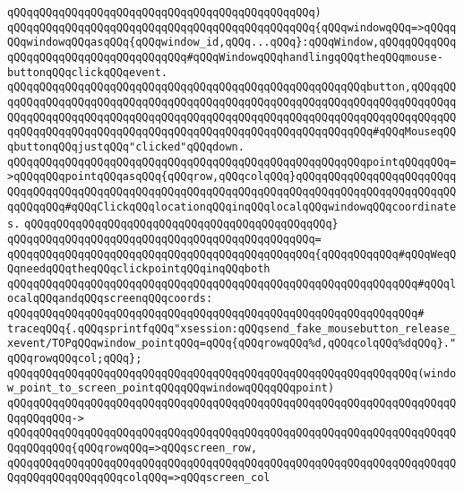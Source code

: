 \verb|qQQqqQQqqQQqqQQqqQQqqQQqqQQqqQQqqQQqqQQqqQQqqQQq)|\newline
\verb|qQQqqQQqqQQqqQQqqQQqqQQqqQQqqQQqqQQqqQQqqQQqqQQq{qQQqwindowqQQq=>qQQqqQQqwindowqQQqasqQQq{qQQqwindow_id,qQQq...qQQq}:qQQqWindow,qQQqqQQqqQQqqQQqqQQqqQQqqQQqqQQqqQQqqQQq#qQQqWindowqQQqhandlingqQQqtheqQQqmouse-buttonqQQqclickqQQqevent.|\newline
\verb|qQQqqQQqqQQqqQQqqQQqqQQqqQQqqQQqqQQqqQQqqQQqqQQqqQQqqQQqbutton,qQQqqQQqqQQqqQQqqQQqqQQqqQQqqQQqqQQqqQQqqQQqqQQqqQQqqQQqqQQqqQQqqQQqqQQqqQQqqQQqqQQqqQQqqQQqqQQqqQQqqQQqqQQqqQQqqQQqqQQqqQQqqQQqqQQqqQQqqQQqqQQqqQQqqQQqqQQqqQQqqQQqqQQqqQQqqQQqqQQqqQQqqQQqqQQqqQQqqQQqqQQq#qQQqMouseqQQqbuttonqQQqjustqQQq"clicked"qQQqdown.|\newline
\verb|qQQqqQQqqQQqqQQqqQQqqQQqqQQqqQQqqQQqqQQqqQQqqQQqqQQqqQQqpointqQQqqQQq=>qQQqqQQqpointqQQqasqQQq{qQQqrow,qQQqcolqQQq}qQQqqQQqqQQqqQQqqQQqqQQqqQQqqQQqqQQqqQQqqQQqqQQqqQQqqQQqqQQqqQQqqQQqqQQqqQQqqQQqqQQqqQQqqQQqqQQqqQQqqQQq#qQQqClickqQQqlocationqQQqinqQQqlocalqQQqwindowqQQqcoordinates.|\newline
\verb|qQQqqQQqqQQqqQQqqQQqqQQqqQQqqQQqqQQqqQQqqQQqqQQq}|\newline
\verb|qQQqqQQqqQQqqQQqqQQqqQQqqQQqqQQqqQQqqQQqqQQqqQQq=|\newline
\verb|qQQqqQQqqQQqqQQqqQQqqQQqqQQqqQQqqQQqqQQqqQQqqQQq{qQQqqQQqqQQq#qQQqWeqQQqneedqQQqtheqQQqclickpointqQQqinqQQqboth|\newline
\verb|qQQqqQQqqQQqqQQqqQQqqQQqqQQqqQQqqQQqqQQqqQQqqQQqqQQqqQQqqQQqqQQq#qQQqlocalqQQqandqQQqscreenqQQqcoords:|\newline
\verb|qQQqqQQqqQQqqQQqqQQqqQQqqQQqqQQqqQQqqQQqqQQqqQQqqQQqqQQqqQQqqQQq#|\newline
\verb|traceqQQq{.qQQqsprintfqQQq"xsession:qQQqsend_fake_mousebutton_release_xevent/TOPqQQqwindow_pointqQQq=qQQq{qQQqrowqQQq%d,qQQqcolqQQq%dqQQq}."qQQqrowqQQqcol;qQQq};|\newline
\verb|qQQqqQQqqQQqqQQqqQQqqQQqqQQqqQQqqQQqqQQqqQQqqQQqqQQqqQQqqQQqqQQq(window_point_to_screen_pointqQQqqQQqwindowqQQqqQQqpoint)|\newline
\verb|qQQqqQQqqQQqqQQqqQQqqQQqqQQqqQQqqQQqqQQqqQQqqQQqqQQqqQQqqQQqqQQqqQQqqQQqqQQqqQQq->|\newline
\verb|qQQqqQQqqQQqqQQqqQQqqQQqqQQqqQQqqQQqqQQqqQQqqQQqqQQqqQQqqQQqqQQqqQQqqQQqqQQqqQQq{qQQqrowqQQq=>qQQqscreen_row,|\newline
\verb|qQQqqQQqqQQqqQQqqQQqqQQqqQQqqQQqqQQqqQQqqQQqqQQqqQQqqQQqqQQqqQQqqQQqqQQqqQQqqQQqqQQqqQQqcolqQQq=>qQQqscreen_col|\newline
